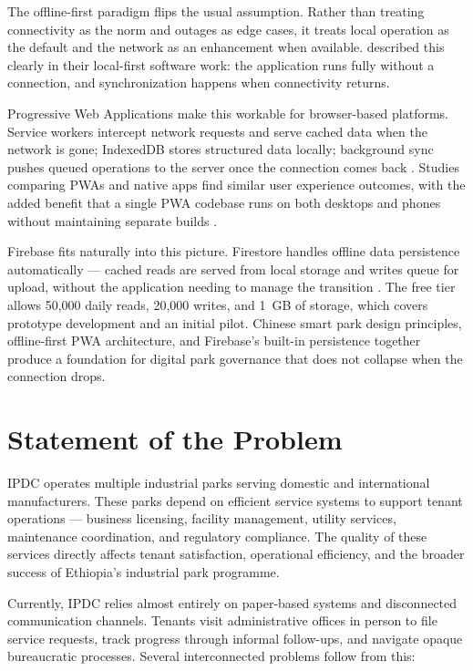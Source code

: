 The offline-first paradigm flips the usual assumption. Rather than treating connectivity as the norm and outages as edge cases, it treats local operation as the default and the network as an enhancement when available. \citet{Kleppmann2019} described this clearly in their local-first software work: the application runs fully without a connection, and synchronization happens when connectivity returns.

Progressive Web Applications make this workable for browser-based platforms. Service workers intercept network requests and serve cached data when the network is gone; IndexedDB stores structured data locally; background sync pushes queued operations to the server once the connection comes back \citep{AterPWA2017, Majchrzak2018, Tandel2018}. Studies comparing PWAs and native apps find similar user experience outcomes, with the added benefit that a single PWA codebase runs on both desktops and phones without maintaining separate builds \citep{AhnAllen2020, BiornHansen2017}.

Firebase fits naturally into this picture. Firestore handles offline data persistence automatically --- cached reads are served from local storage and writes queue for upload, without the application needing to manage the transition \citep{GoogleFirebase2024}. The free tier allows 50,000 daily reads, 20,000 writes, and 1~GB of storage, which covers prototype development and an initial pilot. Chinese smart park design principles, offline-first PWA architecture, and Firebase's built-in persistence together produce a foundation for digital park governance that does not collapse when the connection drops.

\section{Statement of the Problem}

IPDC operates multiple industrial parks serving domestic and international manufacturers. These parks depend on efficient service systems to support tenant operations — business licensing, facility management, utility services, maintenance coordination, and regulatory compliance. The quality of these services directly affects tenant satisfaction, operational efficiency, and the broader success of Ethiopia's industrial park programme.

Currently, IPDC relies almost entirely on paper-based systems and disconnected communication channels. Tenants visit administrative offices in person to file service requests, track progress through informal follow-ups, and navigate opaque bureaucratic processes. Several interconnected problems follow from this:


